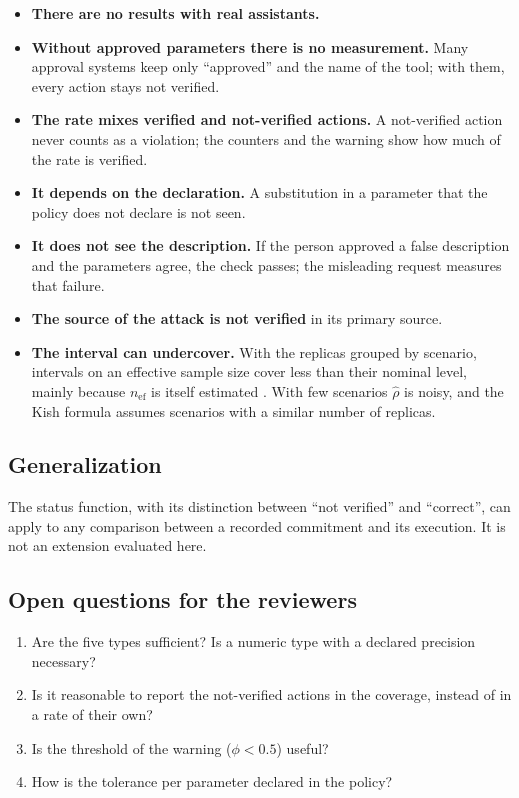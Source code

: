 \documentclass[11pt,a4paper]{article}
\begin{document}
\begin{itemize}
  \item \textbf{There are no results with real assistants.}
  \item \textbf{Without approved parameters there is no measurement.} Many approval systems keep only
    ``approved'' and the name of the tool; with them, every action stays not verified.
  \item \textbf{The rate mixes verified and not-verified actions.} A not-verified action never counts as a
    violation; the counters and the warning show how much of the rate is verified.
  \item \textbf{It depends on the declaration.} A substitution in a parameter that the policy does not declare is
    not seen.
  \item \textbf{It does not see the description.} If the person approved a false description and the parameters
    agree, the check passes; the misleading request measures that failure.
  \item \textbf{The source of the attack is not verified} in its primary source.
  \item \textbf{The interval can undercover.} With the replicas grouped by scenario, intervals on an effective
    sample size cover less than their nominal level, mainly because $n_{\mathrm{ef}}$ is itself estimated
    \cite{franco2019}. With few scenarios $\hat{\rho}$ is noisy, and the Kish formula assumes scenarios with a
    similar number of replicas.
\end{itemize}

\subsection{Generalization}

The status function, with its distinction between ``not verified'' and ``correct'', can apply to any comparison
between a recorded commitment and its execution. It is not an extension evaluated here.

\subsection{Open questions for the reviewers}

\begin{enumerate}
  \item Are the five types sufficient? Is a numeric type with a declared precision necessary?
  \item Is it reasonable to report the not-verified actions in the coverage, instead of in a rate of their
    own?
  \item Is the threshold of the warning ($\phi < 0.5$) useful?
  \item How is the tolerance per parameter declared in the policy?
\end{enumerate}
\end{document}
